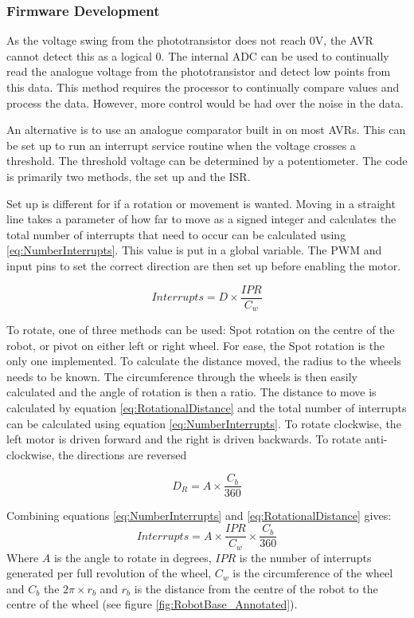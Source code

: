 \subsubsection{Firmware Development}

As the voltage swing from the phototransistor does not reach 0V, the AVR cannot detect this as a logical 0. The internal ADC can be used to continually read the analogue voltage from the phototransistor and detect low points from this data. This method requires the processor to continually compare values and process the data. However, more control would be had over the noise in the data.

An alternative is to use an analogue comparator built in on most AVRs. This can be set up to run an interrupt service routine when the voltage crosses a threshold. The threshold voltage can be determined by a potentiometer. The code is primarily two methods, the set up and the ISR.

Set up is different for if a rotation or movement is wanted. Moving in a straight line takes a parameter of how far to move as a signed integer and calculates the total number of interrupts that need to occur can be calculated using \eqref{eq:NumberInterrupts}. This value is put in a global variable. The PWM and input pins to set the correct direction are then set up before enabling the motor. 

\begin{equation}
\label{eq:NumberInterrupts}
Interrupts = D \times \frac{IPR}{C_w}
\end{equation}

To rotate, one of three methods can be used: Spot rotation on the centre of the robot, or pivot on either left or right wheel. For ease, the Spot rotation is the only one implemented. To calculate the distance moved, the radius to the wheels needs to be known. The circumference through the wheels is then easily calculated and the angle of rotation is then a ratio. The distance to move is calculated by equation \eqref{eq:RotationalDistance} and the total number of interrupts can be calculated using equation \eqref{eq:NumberInterrupts}. To rotate clockwise, the left motor is driven forward and the right is driven backwards. To rotate anti-clockwise, the directions are reversed

\begin{equation}
\label{eq:RotationalDistance}
D_{R} = A \times \frac{C_b}{360}
\end{equation}

Combining equations \eqref{eq:NumberInterrupts} and \eqref{eq:RotationalDistance} gives:
\begin{equation}
\label{eq:RotationalInterrupts}
Interrupts = A \times \frac{IPR}{C_w} \times \frac{C_b}{360}
\end{equation}
Where $A$ is the angle to rotate in degrees, $IPR$ is the number of interrupts generated per full revolution of the wheel, $C_w$ is the circumference of the wheel and $C_b$ the $2\pi\times r_b$ and $r_b$ is the distance from the centre of the robot to the centre of the wheel (see figure \ref{fig:RobotBase_Annotated}).



